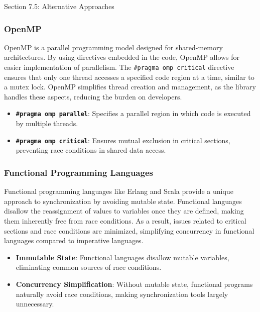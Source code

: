\begin{notes}{Section 7.5: Alternative Approaches}
\begin{highlight}
    \end{highlight}
    
    \subsubsection*{OpenMP}
    
    OpenMP is a parallel programming model designed for shared-memory architectures. By using directives embedded in the code, OpenMP allows for easier implementation of parallelism. The 
    \texttt{\#pragma omp critical} directive ensures that only one thread accesses a specified code region at a time, similar to a mutex lock. OpenMP simplifies thread creation and management, as the 
    library handles these aspects, reducing the burden on developers.
    
    \begin{highlight}[OpenMP]
    
        \begin{itemize}
            \item \textbf{\texttt{\#pragma omp parallel}}: Specifies a parallel region in which code is executed by multiple threads.
            \item \textbf{\texttt{\#pragma omp critical}}: Ensures mutual exclusion in critical sections, preventing race conditions in shared data access.
        \end{itemize}
    
    \end{highlight}
    
    \subsubsection*{Functional Programming Languages}
    
    Functional programming languages like Erlang and Scala provide a unique approach to synchronization by avoiding mutable state. Functional languages disallow the reassignment of values to variables 
    once they are defined, making them inherently free from race conditions. As a result, issues related to critical sections and race conditions are minimized, simplifying concurrency in functional 
    languages compared to imperative languages.
    
    \begin{highlight}
    
        \begin{itemize}
            \item \textbf{Immutable State}: Functional languages disallow mutable variables, eliminating common sources of race conditions.
            \item \textbf{Concurrency Simplification}: Without mutable state, functional programs naturally avoid race conditions, making synchronization tools largely unnecessary.
        \end{itemize}
    

\end{highlight}
\end{notes}
